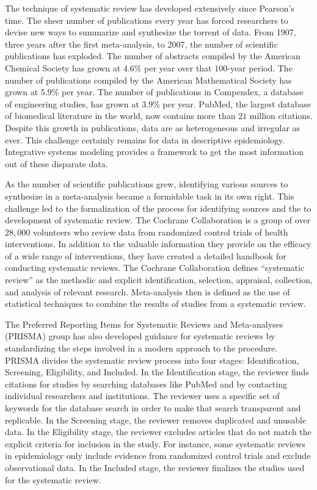 The technique of systematic review has developed extensively since Pearson's time. The
sheer number of publications every year has forced researchers to
devise new ways to summarize and synthesize the torrent of data. From
1907, three years after the first meta-analysis, to 2007, the number of
scientific publications has exploded. The number of abstracts compiled by the
American Chemical Society has grown at $4.6$\% per year over that
$100$-year period. The number of publications compiled by the American Mathematical
Society has grown at $5.9$\% per year.  The number of publications in Compendex, a
database of engineering studies, has grown at $3.9$\% per year.
\cite{Larsen_Rate_2010} PubMed, the largest database of biomedical
literature in the world, now contains more than $21$ million citations.
\cite{us_national_library_of_medicine_national_institutes_of_health_pubmed_2012} Despite this growth in publications, data are
as heterogeneous and irregular as ever. This challenge certainly remains
for data in descriptive epidemiology. Integrative systems modeling
provides a framework to get the most information out of these disparate data.

As the number of scientific publications grew, identifying various
sources to synthesize in a meta-analysis became a formidable task in
its own right. This challenge led to the formalization of the process
for identifying sources and the to development of systematic review.
The Cochrane Collaboration is a
group of over $28,000$ volunteers who review data from randomized
control trials of health interventions.\cite{_cochrane_2012} In addition to the valuable information
they provide on the efficacy of a wide range of interventions, they have
created a detailed handbook for conducting systematic
reviews. The Cochrane Collaboration defines ``systematic review'' as the
methodic and explicit identification, selection, appraisal, collection,
and analysis of relevant research.  Meta-analysis then is defined as the use of statistical
techniques to combine the results of studies from a systematic review.\cite{Green_Systematic_2005}

The Preferred Reporting Items for Systematic Reviews and Meta-analyses
(PRISMA) group has also developed guidance for systematic reviews by
standardizing the steps involved in a modern approach to
the procedure.\cite{moher_preferred_2009} PRISMA divides the systematic
review process into four stages: Identification, Screening,
Eligibility, and Included.  In the Identification stage, the reviewer
finds citations for studies by searching databases like PubMed and by
contacting individual researchers and institutions. The reviewer uses
a specific set of keywords for the database search in order to make
that search transparent and replicable. In the Screening stage, the
reviewer removes duplicated and unusable data. In the Eligibility stage,
the reviewer excludes articles that do not match the explicit criteria
for inclusion in the study. For instance, some systematic reviews in
epidemiology only include evidence from randomized control trials and
exclude observational data. In the Included stage, the reviewer
finalizes the studies used for the systematic review.

